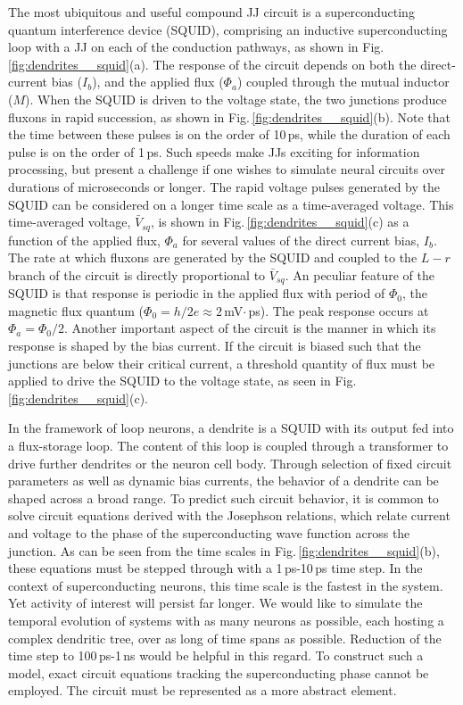 \documentclass[twocolumn]{article}
\begin{document}
The most ubiquitous and useful compound JJ circuit is a superconducting quantum interference device (SQUID), comprising an inductive superconducting loop with a JJ on each of the conduction pathways, as shown in Fig.\,\ref{fig:dendrites__squid}(a). The response of the circuit depends on both the direct-current bias ($I_b$), and the applied flux ($\Phi_a$) coupled through the mutual inductor ($M$). When the SQUID is driven to the voltage state, the two junctions produce fluxons in rapid succession, as shown in Fig.\,\ref{fig:dendrites__squid}(b). Note that the time between these pulses is on the order of 10\,ps, while the duration of each pulse is on the order of 1\,ps. Such speeds make JJs exciting for information processing, but present a challenge if one wishes to simulate neural circuits over durations of microseconds or longer. The rapid voltage pulses generated by the SQUID can be considered on a longer time scale as a time-averaged voltage. This time-averaged voltage, $\bar{V}_{sq}$, is shown in Fig.\,\ref{fig:dendrites__squid}(c) as a function of the applied flux, $\Phi_a$ for several values of the direct current bias, $I_b$. The rate at which fluxons are generated by the SQUID and coupled to the $L-r$ branch of the circuit is directly proportional to $\bar{V}_{sq}$. An peculiar feature of the SQUID is that response is periodic in the applied flux with period of $\Phi_0$, the magnetic flux quantum ($\Phi_0 = h/2e \approx 2$\,mV$\cdot$\,ps). The peak response occurs at $\Phi_a = \Phi_0/2$. Another important aspect of the circuit is the manner in which its response is shaped by the bias current. If the circuit is biased such that the junctions are below their critical current, a threshold quantity of flux must be applied to drive the SQUID to the voltage state, as seen in Fig.\,\ref{fig:dendrites__squid}(c). 

In the framework of loop neurons, a dendrite is a SQUID with its output fed into a flux-storage loop. The content of this loop is coupled through a transformer to drive further dendrites or the neuron cell body. Through selection of fixed circuit parameters as well as dynamic bias currents, the behavior of a dendrite can be shaped across a broad range. To predict such circuit behavior, it is common to solve circuit equations derived with the Josephson relations, which relate current and voltage to the phase of the superconducting wave function across the junction. As can be seen from the time scales in Fig.\,\ref{fig:dendrites__squid}(b), these equations must be stepped through with a 1\,ps-10\,ps time step. In the context of superconducting neurons, this time scale is the fastest in the system. Yet activity of interest will persist far longer. We would like to simulate the temporal evolution of systems with as many neurons as possible, each hosting a complex dendritic tree, over as long of time spans as possible. Reduction of the time step to 100\,ps-1\,ns would be helpful in this regard. To construct such a model, exact circuit equations tracking the superconducting phase cannot be employed. The circuit must be represented as a more abstract element.
\end{document}
